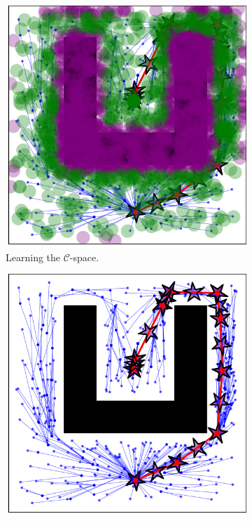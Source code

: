 \documentclass{ctuthesis}
\begin{document}
\begin{figure}[!ht]
  \centering 
  \begin{subfigure}[b]{0.45\textwidth}
      \includegraphics[width=\textwidth]{figChap4/RRTstar2DML_learning237.2.pdf}
      \caption{Learning the $\mathcal{C}$-space.}
      \label{fig:rrtstarML2D_learning}
  \end{subfigure}  
  \begin{subfigure}[b]{0.45\textwidth}
      \includegraphics[width=\textwidth]{figChap4/RRTstar2DML_maze237.2.pdf}

\end{subfigure}
\end{figure}
\end{document}
